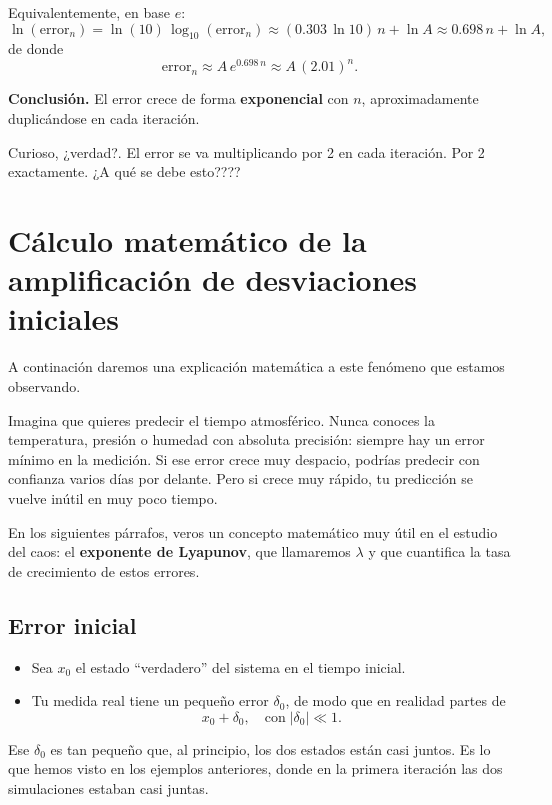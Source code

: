 \documentclass[
  11pt,
  a4paper,
  DIV=11,
  numbers=noendperiod]{scrreprt}
\providecommand{\tightlist}{%
  \setlength{\itemsep}{0pt}\setlength{\parskip}{0pt}}
\begin{document}
Equivalentemente, en base \(e\): \[
\ln(\mathrm{error}_n)
= \ln(10)\,\log_{10}(\mathrm{error}_n)
\approx (0.303\,\ln 10)\,n + \ln A
\approx 0.698\,n + \ln A,
\] de donde \[
\mathrm{error}_n \approx A\,e^{0.698\,n}\approx A\,(2.01)^n.
\]

\textbf{Conclusión.} El error crece de forma \textbf{exponencial} con
\(n\), aproximadamente duplicándose en cada iteración.

Curioso, ¿verdad?. El error se va multiplicando por 2 en cada iteración.
Por 2 exactamente. ¿A qué se debe esto????

\section{Cálculo matemático de la amplificación de desviaciones
iniciales}\label{cuxe1lculo-matemuxe1tico-de-la-amplificaciuxf3n-de-desviaciones-iniciales}

A continación daremos una explicación matemática a este fenómeno que
estamos observando.

Imagina que quieres predecir el tiempo atmosférico. Nunca conoces la
temperatura, presión o humedad con absoluta precisión: siempre hay un
error mínimo en la medición. Si ese error crece muy despacio, podrías
predecir con confianza varios días por delante. Pero si crece muy
rápido, tu predicción se vuelve inútil en muy poco tiempo.

En los siguientes párrafos, veros un concepto matemático muy útil en el
estudio del caos: el \textbf{exponente de Lyapunov}, que llamaremos
\(\lambda\) y que cuantifica la tasa de crecimiento de estos errores.

\subsection{Error inicial}\label{error-inicial}

\begin{itemize}
\tightlist
\item
  Sea \(x_0\) el estado ``verdadero'' del sistema en el tiempo
  inicial.\\
\item
  Tu medida real tiene un pequeño error \(\delta_0\), de modo que en
  realidad partes de\\
  \[
     x_0 + \delta_0,
     \quad\text{con}\;|\delta_0|\ll 1.
   \]
\end{itemize}

Ese \(\delta_0\) es tan pequeño que, al principio, los dos estados están
casi juntos. Es lo que hemos visto en los ejemplos anteriores, donde en
la primera iteración las dos simulaciones estaban casi juntas.
\end{document}
